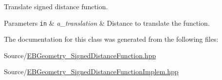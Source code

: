 Translate signed distance function. 


\begin{DoxyParams}[1]{Parameters}
\mbox{\tt in}  & {\em a\+\_\+translation} & Distance to translate the function. \\
\hline
\end{DoxyParams}


The documentation for this class was generated from the following files\+:\begin{DoxyCompactItemize}
\item 
Source/\hyperlink{EBGeometry__SignedDistanceFunction_8hpp}{E\+B\+Geometry\+\_\+\+Signed\+Distance\+Function.\+hpp}\item 
Source/\hyperlink{EBGeometry__SignedDistanceFunctionImplem_8hpp}{E\+B\+Geometry\+\_\+\+Signed\+Distance\+Function\+Implem.\+hpp}\end{DoxyCompactItemize}
